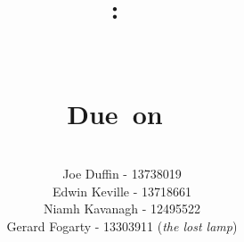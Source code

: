\documentclass{article}
\title{
\vspace{2in}
\textmd{\textbf{\hmwkClass:\ \hmwkClassTime}}\\
\normalsize\
\vspace{0.1in}\large{\textit{\hmwkClassInstructor}}\\
\vspace{0.2in}
\textmd{\textbf{\hmwkTitle}}\\
\small{Due\ on\ \hmwkDueDate}\\
\vspace{.5in}
}
\author{\textbf{\hmwkAuthorName}\\
Joe Duffin - 13738019\\
Edwin Keville - 13718661\\
Niamh Kavanagh - 12495522\\
Gerard Fogarty - 13303911 (\textit{the lost lamp})
}
\date{} %
\begin{document}
\begin{titlepage}
\maketitle
\thispagestyle{empty}
\end{titlepage}

\newpage


\newpage
\tableofcontents
\newpage

\end{document}
